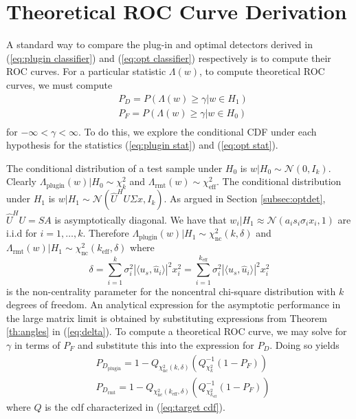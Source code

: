 \section{Theoretical ROC Curve Derivation}\label{sec:roc}
A standard way to compare the plug-in and optimal detectors derived in (\ref{eq:plugin classifier}) and (\ref{eq:opt classifier}) respectively is to compute their ROC curves. For a particular statistic $\Lambda(w)$, to compute theoretical ROC curves, we must compute
\begin{equation}\label{eq:target cdf}
\begin{aligned}
&P_D = P(\Lambda(w) \geq \gamma| w\in H_1)\\
&P_F = P(\Lambda(w) \geq \gamma| w\in H_0)\\
\end{aligned}
\end{equation}
for $-\infty<\gamma<\infty$. To do this, we explore the conditional CDF under each hypothesis for the statistics (\ref{eq:plugin stat}) and (\ref{eq:opt stat}).

The conditional distribution of a test sample under $H_0$ is $w|H_0\sim\mathcal{N}(0,I_k)$. Clearly $\Lambda_\text{plugin}(w)|H_0\sim\chi_k^2$ and $\Lambda_\text{rmt}(w)\sim\chi_\text{eff}^2$. The conditional distribution under $H_1$ is $w|H_1\sim\mathcal{N}(\widehat{U}^HU\Sigma x,I_k)$. As argued in Section \ref{subsec:optdet}, $\widehat{U}^HU=SA$ is asymptotically diagonal. We have that $w_i|H_1\approx\mathcal{N}(a_is_i\sigma_ix_i,1)$ are i.i.d for $i=1,\dots,k$. Therefore $\Lambda_\text{plugin}(w)|H_1\sim\chi_\text{nc}^2(k,\delta)$ and $\Lambda_\text{rmt}(w)|H_1\sim\chi_\text{nc}^2(k_\text{eff},\delta)$ where
\begin{equation}\label{eq:delta}
\delta=\sum_{i=1}^k\sigma_i^2|\langle u_s,\widehat{u}_i\rangle|^2x_i^2=\sum_{i=1}^{k_\text{eff}}\sigma_i^2|\langle u_s,\widehat{u}_i\rangle|^2x_i^2
 \end{equation}
is the non-centrality parameter for the noncentral chi-square distribution with $k$ degrees of freedom. An analytical expression for the asymptotic performance in the large matrix limit  is obtained by substituting expressions from Theorem \ref{th:angles} in (\ref{eq:delta}). To compute a theoretical ROC curve, we may solve for $\gamma$ in terms of $P_F$ and substitute this into the expression for $P_D$. Doing so yields
\begin{equation}\label{eq:roc}
\begin{aligned}
&P_{D_\text{plugin}}=1-Q_{\chi_\text{nc}^2(k,\delta)}\left(Q^{-1}_{\chi^2_k}\left(1-P_F\right)\right)\\
&P_{D_\text{rmt}}=1-Q_{\chi_\text{nc}^2(k_\text{eff},\delta)}\left(Q^{-1}_{\chi^2_{k_\text{eff}}}\left(1-P_F\right)\right)
\end{aligned}
\end{equation}
where $Q$ is the cdf characterized in (\ref{eq:target cdf}). 

